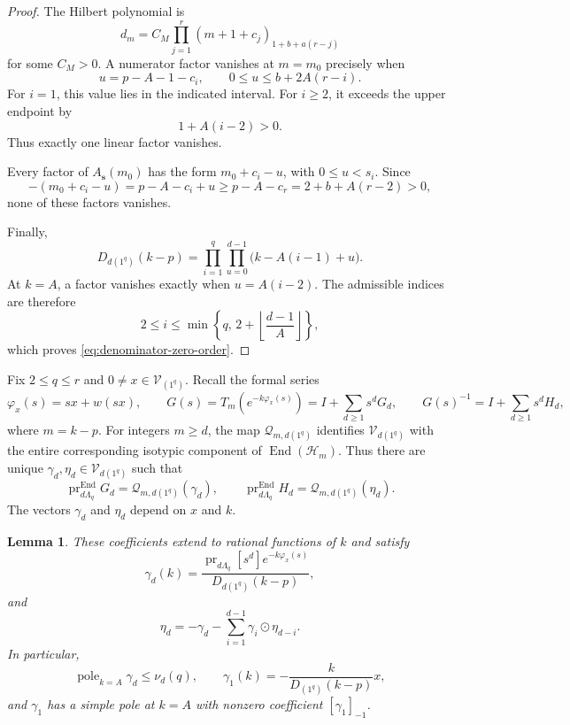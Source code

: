 \documentclass[11pt,reqno]{amsart}
\newtheorem{lemma}[theorem]{Lemma}
\theoremstyle{corollary}
\theoremstyle{conjecture}
\theoremstyle{assumption}
\theoremstyle{proposition}
\theoremstyle{remark}
\numberwithin{equation}{section}
\begin{document}
\begin{proof}
The Hilbert polynomial is
\[
d_m=C_M\prod_{j=1}^{r}(m+1+c_j)_{1+b+a(r-j)}
\]
for some $C_M>0$. A numerator factor vanishes at $m=m_0$ precisely when
\[
u=p-A-1-c_i,\qquad 0\leq u\leq b+2A(r-i).
\]
For $i=1$, this value lies in the indicated interval. For $i\geq  2$, it exceeds the upper endpoint by
\[
1+A(i-2)>0.
\]
Thus exactly one linear factor vanishes.

Every factor of $A_{\mathbf s}(m_0)$ has the form $m_0+c_i-u$, with $0\leq u<s_i$. Since
\[
-(m_0+c_i-u)=p-A-c_i+u\geq p-A-c_r=2+b+A(r-2)>0,
\]
none of these factors vanishes.

Finally,
\[
D_{d(1^q)}(k-p)=\prod_{i=1}^{q}\prod_{u=0}^{d-1}\bigl(k-A(i-1)+u\bigr).
\]
At $k=A$, a factor vanishes exactly when $u=A(i-2)$. The admissible indices are therefore
\[
2\leq i\leq \min\left\{q,\,2+\left\lfloor\frac{d-1}{A}\right\rfloor\right\},
\]
which proves \eqref{eq:denominator-zero-order}.
\end{proof}

Fix $2\leq q\leq r$ and $0\neq x\in\mathcal V_{(1^q)}$. Recall the formal series
\[
\varphi_x(s)=sx+w(sx),\qquad G(s)=T_m(e^{-k\varphi_x(s)})=I+\sum_{d\geq1}s^dG_d,\qquad G(s)^{-1}=I+\sum_{d\geq1}s^dH_d,
\]
where $m=k-p$. For integers $m\geq d$, the map $\mathcal Q_{m,d(1^q)}$ identifies $\mathcal V_{d(1^q)}$ with the entire corresponding isotypic component of $\operatorname{End}(\mathcal H_m)$. Thus there are unique $\gamma_d,\eta_d\in\mathcal V_{d(1^q)}$ such that
\[
\operatorname{pr}^{\operatorname{End}}_{d\Lambda_q}G_d=\mathcal Q_{m,d(1^q)}(\gamma_d),\qquad\operatorname{pr}^{\operatorname{End}}_{d\Lambda_q}H_d=\mathcal Q_{m,d(1^q)}(\eta_d).
\]
The vectors $\gamma_d$ and $\eta_d$ depend on $x$ and $k$.

\begin{lemma}\label{lem:projected-gram-coefficients}
These coefficients extend to rational functions of $k$ and satisfy
\begin{equation}\label{eq:gamma-explicit}
\gamma_d(k)=\frac{\operatorname{pr}_{d\Lambda_q}[s^d]e^{-k\varphi_x(s)}}{D_{d(1^q)}(k-p)},
\end{equation}
and
\begin{equation}\label{eq:eta-recursion}
\eta_d=-\gamma_d-\sum_{i=1}^{d-1}\gamma_i\odot\eta_{d-i}.
\end{equation}
In particular,
\[
\operatorname{pole}_{k=A}\gamma_d\leq\nu_d(q),\qquad \gamma_1(k)=-\frac{k}{D_{(1^q)}(k-p)}x,
\]
and $\gamma_1$ has a simple pole at $k=A$ with nonzero coefficient $[\gamma_1]_{-1}$.
\end{lemma}
\end{document}
